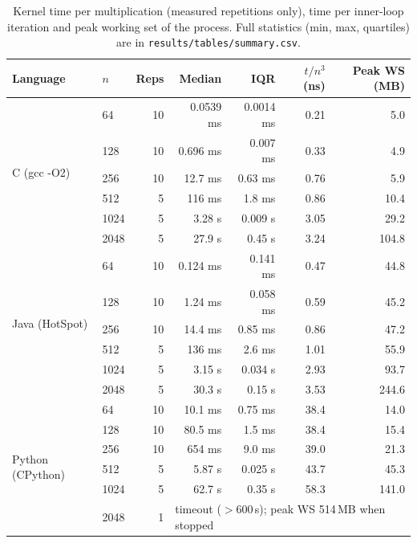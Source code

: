 \documentclass[11pt,a4paper]{article}
\begin{document}
\begin{table}[htbp]
  \centering\small
  \caption{Kernel time per multiplication (measured repetitions only), time per inner-loop
  iteration and peak working set of the process. Full statistics (min, max, quartiles) are in
  \texttt{results/tables/summary.csv}.}
  \label{tab:summary}
  \begin{tabular}{llrrrrr}
    \toprule
    Language & $n$ & Reps & Median & IQR & $t/n^3$ (ns) & Peak WS (MB) \\
    \midrule
    \multirow{6}{*}{C (gcc -O2)}
      & 64   & 10 & 0.0539 ms & 0.0014 ms & 0.21 & 5.0 \\
      & 128  & 10 & 0.696 ms  & 0.007 ms  & 0.33 & 4.9 \\
      & 256  & 10 & 12.7 ms   & 0.63 ms   & 0.76 & 5.9 \\
      & 512  & 5  & 116 ms    & 1.8 ms    & 0.86 & 10.4 \\
      & 1024 & 5  & 3.28 s    & 0.009 s   & 3.05 & 29.2 \\
      & 2048 & 5  & 27.9 s    & 0.45 s    & 3.24 & 104.8 \\
    \midrule
    \multirow{6}{*}{Java (HotSpot)}
      & 64   & 10 & 0.124 ms  & 0.141 ms  & 0.47 & 44.8 \\
      & 128  & 10 & 1.24 ms   & 0.058 ms  & 0.59 & 45.2 \\
      & 256  & 10 & 14.4 ms   & 0.85 ms   & 0.86 & 47.2 \\
      & 512  & 5  & 136 ms    & 2.6 ms    & 1.01 & 55.9 \\
      & 1024 & 5  & 3.15 s    & 0.034 s   & 2.93 & 93.7 \\
      & 2048 & 5  & 30.3 s    & 0.15 s    & 3.53 & 244.6 \\
    \midrule
    \multirow{6}{*}{Python (CPython)}
      & 64   & 10 & 10.1 ms   & 0.75 ms   & 38.4 & 14.0 \\
      & 128  & 10 & 80.5 ms   & 1.5 ms    & 38.4 & 15.4 \\
      & 256  & 10 & 654 ms    & 9.0 ms    & 39.0 & 21.3 \\
      & 512  & 5  & 5.87 s    & 0.025 s   & 43.7 & 45.3 \\
      & 1024 & 5  & 62.7 s    & 0.35 s    & 58.3 & 141.0 \\
      & 2048 & 1  & \multicolumn{4}{l}{timeout ($>600$\,s); peak WS 514\,MB when stopped} \\
    \bottomrule
  \end{tabular}
\end{table}
\end{document}
